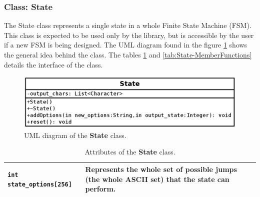 \documentclass[11pt,twoside,openany,x11names,svgnames]{memoir}
\begin{document}
\newpage 

\subsubsection{Class: State}\label{Class-State}

The State class represents a single state in a whole Finite State Machine (FSM). This class is expected to be used only by the library, but is accessible by the user if a new FSM is being designed. The UML diagram found in the figure \ref{fig:class-state} shows the general idea behind the class. The tables \ref{tab:State-Attributes} and \ref{tab:State-MemberFunctions} details the interface of the class.

\begin{figure}
	\centering
	\includegraphics[scale=0.4, clip=true, trim= 0pt 0pt 0pt 0pt]{images/chapter03-image09}
	\caption{UML diagram of the \textbf{State} class.}
	\label{fig:class-state}
\end{figure}

\begin{table}[h]\footnotesize
\centering
\begin{tabular}{| >{\bfseries}p{4cm} | p{11.5cm} |}
	\hline
	
	\texttt{int state\_options[256]} & Represents the whole set of possible jumps (the whole ASCII set) that the state can perform. \\
	
	\hline
\end{tabular}
\caption{Attributes of the \textbf{State} class.}
\label{tab:State-Attributes}
\end{table}
\end{document}
